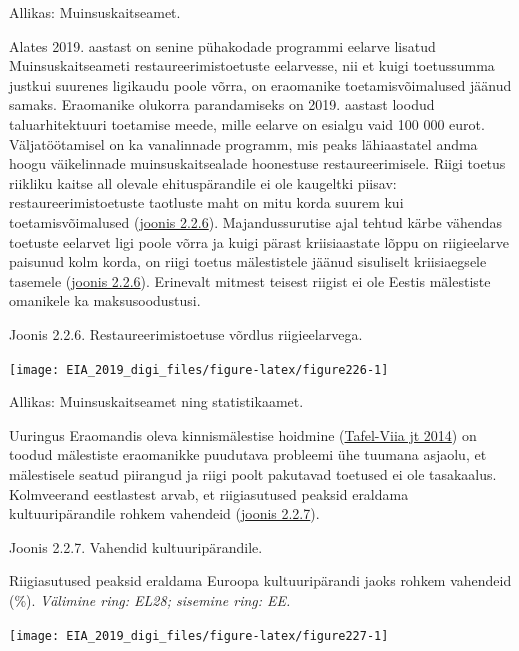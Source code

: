 \documentclass[estonian,]{article}
\begin{document}
\begin{imgsource}
{Allikas:} Muinsuskaitseamet.
\end{imgsource}

Alates 2019. aastast on senine pühakodade programmi eelarve lisatud Muinsuskaitseameti restaureerimistoetuste eelarvesse, nii et kuigi toetussumma justkui suurenes ligikaudu poole võrra, on eraomanike toetamisvõimalused jäänud samaks. Eraomanike olukorra parandamiseks on 2019. aastast loodud taluarhitektuuri toetamise meede, mille eelarve on esialgu vaid 100 000 eurot. Väljatöötamisel on ka vanalinnade programm, mis peaks lähiaastatel andma hoogu väikelinnade muinsuskaitsealade hoonestuse restaureerimisele.
Riigi toetus riikliku kaitse all olevale ehituspärandile ei ole kaugeltki piisav: restaureerimistoetuste taotluste maht on mitu korda suurem kui toetamisvõimalused (\protect\hyperlink{figure226}{joonis 2.2.6}). Majandussurutise ajal tehtud kärbe vähendas toetuste eelarvet ligi poole võrra ja kuigi pärast kriisiaastate lõppu on riigieelarve paisunud kolm korda, on riigi toetus mälestistele jäänud sisuliselt kriisiaegsele tasemele (\protect\hyperlink{figure226}{joonis 2.2.6}). Erinevalt mitmest teisest riigist ei ole Eestis mälestiste omanikele ka maksusoodustusi.

{Joonis 2.2.6.} Restaureerimistoetuse võrdlus riigieelarvega.

\begin{center}\texttt{[image: EIA\_2019\_digi\_files/figure-latex/figure226-1]} \end{center}

\begin{imgsource}
{Allikas:} Muinsuskaitseamet ning statistikaamet.
\end{imgsource}

Uuringus Eraomandis oleva kinnismälestise hoidmine (\protect\hyperlink{Tafel2014}{Tafel-Viia jt 2014}) on toodud mälestiste eraomanikke puudutava probleemi ühe tuumana asjaolu, et mälestisele seatud piirangud ja riigi poolt pakutavad toetused ei ole tasakaalus. Kolmveerand eestlastest arvab, et riigiasutused peaksid eraldama kultuuripärandile rohkem vahendeid (\protect\hyperlink{figure227}{joonis 2.2.7}).

{Joonis 2.2.7.} Vahendid kultuuripärandile.

Riigiasutused peaksid eraldama Euroopa kultuuripärandi jaoks rohkem vahendeid (\%).
\emph{Välimine ring: EL28; sisemine ring: EE.}

\begin{center}\texttt{[image: EIA\_2019\_digi\_files/figure-latex/figure227-1]} \end{center}
\end{document}
